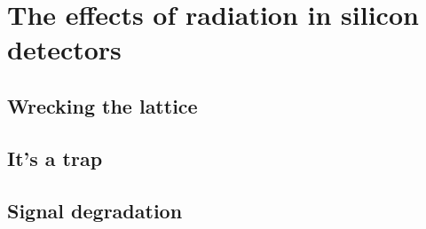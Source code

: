\chapter{The effects of radiation in silicon detectors}


\section{Wrecking the lattice}

\section{It's a trap}

\section{Signal degradation}
